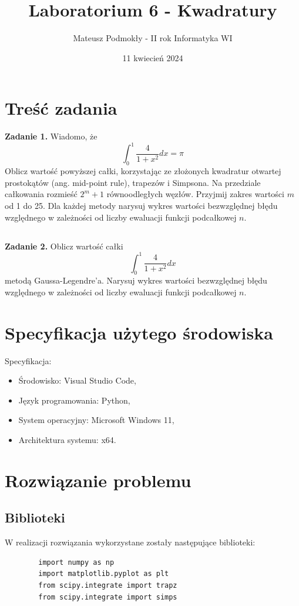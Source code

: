 \documentclass[11pt]{scrartcl}
\title{Laboratorium 6 - Kwadratury}
\author{Mateusz Podmokły - II rok Informatyka WI}
\date{11 kwiecień 2024}
\begin{document}
    \maketitle
    \section{Treść zadania}
    \textbf{Zadanie 1.} Wiadomo, że
    \[
        \int_{0}^{1}\frac{4}{1+x^2}dx=\pi
    \]
    Oblicz wartość powyższej całki, korzystając ze złożonych
    kwadratur otwartej prostokątów (ang. mid-point rule),
    trapezów i Simpsona. Na przedziale całkowania rozmieść
    $2^m+1$ równoodległych węzłów. Przyjmij zakres
    wartości $m$ od 1 do 25. Dla każdej metody narysuj wykres
    wartości bezwzględnej błędu względnego w zależności od
    liczby ewaluacji funkcji podcałkowej $n$.
    \subsection*{}
    \textbf{Zadanie 2.} Oblicz wartość całki
    \[
        \int_{0}^{1}\frac{4}{1+x^2}dx
    \]
    metodą Gaussa-Legendre'a. Narysuj wykres wartości bezwzględnej
    błędu względnego w zależności od liczby ewaluacji funkcji
    podcałkowej $n$.

    \section{Specyfikacja użytego środowiska}
    Specyfikacja:

    \begin{itemize}
        \item Środowisko: Visual Studio Code,
        \item Język programowania: Python,
        \item System operacyjny: Microsoft Windows 11,
        \item Architektura systemu: x64.
    \end{itemize}

    \section{Rozwiązanie problemu}
    \subsection{Biblioteki}
    W realizacji rozwiązania wykorzystane zostały następujące
    biblioteki:
    \begin{lstlisting}
        import numpy as np
        import matplotlib.pyplot as plt
        from scipy.integrate import trapz
        from scipy.integrate import simps
    \end{lstlisting}
\end{document}
